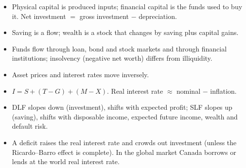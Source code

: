 \begin{itemize}
  \item Physical capital is produced inputs; financial capital is the funds used to buy
        it. Net investment $=$ gross investment $-$ depreciation.
  \item Saving is a flow; wealth is a stock that changes by saving plus capital gains.
  \item Funds flow through loan, bond and stock markets and through financial
        institutions; insolvency (negative net worth) differs from illiquidity.
  \item Asset prices and interest rates move inversely.
  \item $I = S + (T - G) + (M - X)$. Real interest rate $\approx$ nominal $-$ inflation.
  \item DLF slopes down (investment), shifts with expected profit; SLF slopes up
        (saving), shifts with disposable income, expected future income, wealth and
        default risk.
  \item A deficit raises the real interest rate and crowds out investment (unless the
        Ricardo--Barro effect is complete). In the global market Canada borrows or lends
        at the world real interest rate.
\end{itemize}
